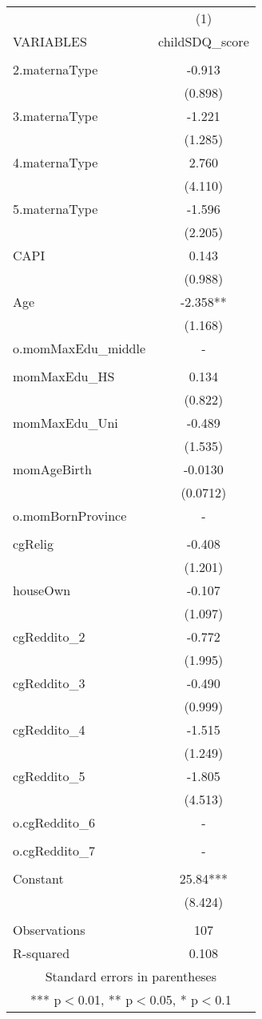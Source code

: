 \begin{tabular}{lc} \hline
 & (1) \\
VARIABLES & childSDQ\_score \\ \hline
 &  \\
2.maternaType & -0.913 \\
 & (0.898) \\
3.maternaType & -1.221 \\
 & (1.285) \\
4.maternaType & 2.760 \\
 & (4.110) \\
5.maternaType & -1.596 \\
 & (2.205) \\
CAPI & 0.143 \\
 & (0.988) \\
Age & -2.358** \\
 & (1.168) \\
o.momMaxEdu\_middle & - \\
 &  \\
momMaxEdu\_HS & 0.134 \\
 & (0.822) \\
momMaxEdu\_Uni & -0.489 \\
 & (1.535) \\
momAgeBirth & -0.0130 \\
 & (0.0712) \\
o.momBornProvince & - \\
 &  \\
cgRelig & -0.408 \\
 & (1.201) \\
houseOwn & -0.107 \\
 & (1.097) \\
cgReddito\_2 & -0.772 \\
 & (1.995) \\
cgReddito\_3 & -0.490 \\
 & (0.999) \\
cgReddito\_4 & -1.515 \\
 & (1.249) \\
cgReddito\_5 & -1.805 \\
 & (4.513) \\
o.cgReddito\_6 & - \\
 &  \\
o.cgReddito\_7 & - \\
 &  \\
Constant & 25.84*** \\
 & (8.424) \\
 &  \\
Observations & 107 \\
 R-squared & 0.108 \\ \hline
\multicolumn{2}{c}{ Standard errors in parentheses} \\
\multicolumn{2}{c}{ *** p$<$0.01, ** p$<$0.05, * p$<$0.1} \\
\end{tabular}
